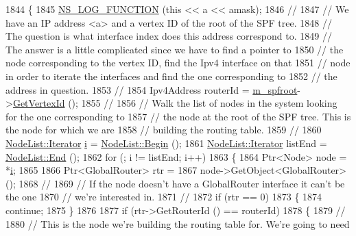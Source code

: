 \begin{DoxyCode}
1844 \{
1845   \hyperlink{log-macros-disabled_8h_a90b90d5bad1f39cb1b64923ea94c0761}{NS\_LOG\_FUNCTION} (\textcolor{keyword}{this} << a << amask);
1846 \textcolor{comment}{//}
1847 \textcolor{comment}{// We have an IP address <a> and a vertex ID of the root of the SPF tree.}
1848 \textcolor{comment}{// The question is what interface index does this address correspond to.}
1849 \textcolor{comment}{// The answer is a little complicated since we have to find a pointer to}
1850 \textcolor{comment}{// the node corresponding to the vertex ID, find the Ipv4 interface on that}
1851 \textcolor{comment}{// node in order to iterate the interfaces and find the one corresponding to}
1852 \textcolor{comment}{// the address in question.}
1853 \textcolor{comment}{//}
1854   Ipv4Address routerId = \hyperlink{classns3_1_1GlobalRouteManagerImpl_a977f6b62ef1f1b58d041a2f49c093a1c}{m\_spfroot}->\hyperlink{classns3_1_1SPFVertex_addc1067d86f26e9fe3b2e34ed16f929c}{GetVertexId} ();
1855 \textcolor{comment}{//}
1856 \textcolor{comment}{// Walk the list of nodes in the system looking for the one corresponding to}
1857 \textcolor{comment}{// the node at the root of the SPF tree.  This is the node for which we are}
1858 \textcolor{comment}{// building the routing table.}
1859 \textcolor{comment}{//}
1860   \hyperlink{classns3_1_1NodeList_a9e2679a94efb4f0066cc21e65440364d}{NodeList::Iterator} \hyperlink{bernuolliDistribution_8m_a6f6ccfcf58b31cb6412107d9d5281426}{i} = \hyperlink{classns3_1_1NodeList_a93d2211831f5cb71d1dbb721e2721d7f}{NodeList::Begin} (); 
1861   \hyperlink{classns3_1_1NodeList_a9e2679a94efb4f0066cc21e65440364d}{NodeList::Iterator} listEnd = \hyperlink{classns3_1_1NodeList_a027a558c16e6078e25c7ffc67becb559}{NodeList::End} ();
1862   \textcolor{keywordflow}{for} (; i != listEnd; i++)
1863     \{
1864       Ptr<Node> node = *\hyperlink{bernuolliDistribution_8m_a6f6ccfcf58b31cb6412107d9d5281426}{i};
1865 
1866       Ptr<GlobalRouter> rtr = 
1867         node->GetObject<GlobalRouter> ();
1868 \textcolor{comment}{//}
1869 \textcolor{comment}{// If the node doesn't have a GlobalRouter interface it can't be the one}
1870 \textcolor{comment}{// we're interested in.}
1871 \textcolor{comment}{//}
1872       \textcolor{keywordflow}{if} (rtr == 0)
1873         \{
1874           \textcolor{keywordflow}{continue};
1875         \}
1876 
1877       \textcolor{keywordflow}{if} (rtr->GetRouterId () == routerId)
1878         \{
1879 \textcolor{comment}{//}
1880 \textcolor{comment}{// This is the node we're building the routing table for.  We're going to need}

\end{DoxyCode}
